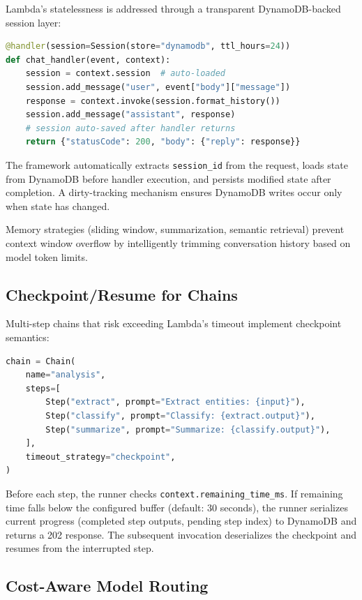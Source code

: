 \documentclass[11pt,a4paper]{article}
\begin{document}
Lambda's statelessness is addressed through a transparent DynamoDB-backed session layer:

\begin{lstlisting}[language=Python]
@handler(session=Session(store="dynamodb", ttl_hours=24))
def chat_handler(event, context):
    session = context.session  # auto-loaded
    session.add_message("user", event["body"]["message"])
    response = context.invoke(session.format_history())
    session.add_message("assistant", response)
    # session auto-saved after handler returns
    return {"statusCode": 200, "body": {"reply": response}}
\end{lstlisting}

The framework automatically extracts \texttt{session\_id} from the request, loads state from DynamoDB before handler execution, and persists modified state after completion. A dirty-tracking mechanism ensures DynamoDB writes occur only when state has changed.

Memory strategies (sliding window, summarization, semantic retrieval) prevent context window overflow by intelligently trimming conversation history based on model token limits.

\subsection{Checkpoint/Resume for Chains}

Multi-step chains that risk exceeding Lambda's timeout implement checkpoint semantics:

\begin{lstlisting}[language=Python]
chain = Chain(
    name="analysis",
    steps=[
        Step("extract", prompt="Extract entities: {input}"),
        Step("classify", prompt="Classify: {extract.output}"),
        Step("summarize", prompt="Summarize: {classify.output}"),
    ],
    timeout_strategy="checkpoint",
)
\end{lstlisting}

Before each step, the runner checks \texttt{context.remaining\_time\_ms}. If remaining time falls below the configured buffer (default: 30 seconds), the runner serializes current progress (completed step outputs, pending step index) to DynamoDB and returns a 202 response. The subsequent invocation deserializes the checkpoint and resumes from the interrupted step.

\subsection{Cost-Aware Model Routing}
\end{document}
